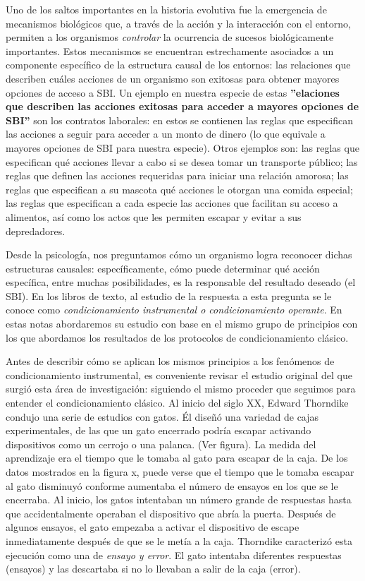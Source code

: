 \documentclass[
  a4paper,
  DIV=11,
  numbers=noendperiod]{scrreprt}
\begin{document}
Uno de los saltos importantes en la historia evolutiva fue la emergencia
de mecanismos biológicos que, a través de la acción y la interacción con
el entorno, permiten a los organismos \emph{controlar} la ocurrencia de
sucesos biológicamente importantes. Estos mecanismos se encuentran
estrechamente asociados a un componente específico de la estructura
causal de los entornos: las relaciones que describen cuáles acciones de
un organismo son exitosas para obtener mayores opciones de acceso a SBI.
Un ejemplo en nuestra especie de estas \textbf{''elaciones que describen
las acciones exitosas para acceder a mayores opciones de SBI''} son los
contratos laborales: en estos se contienen las reglas que especifican
las acciones a seguir para acceder a un monto de dinero (lo que equivale
a mayores opciones de SBI para nuestra especie). Otros ejemplos son: las
reglas que especifican qué acciones llevar a cabo si se desea tomar un
transporte público; las reglas que definen las acciones requeridas para
iniciar una relación amorosa; las reglas que especifican a su mascota
qué acciones le otorgan una comida especial; las reglas que especifican
a cada especie las acciones que facilitan su acceso a alimentos, así
como los actos que les permiten escapar y evitar a sus depredadores.

Desde la psicología, nos preguntamos cómo un organismo logra reconocer
dichas estructuras causales: específicamente, cómo puede determinar qué
acción específica, entre muchas posibilidades, es la responsable del
resultado deseado (el SBI). En los libros de texto, al estudio de la
respuesta a esta pregunta se le conoce como \emph{condicionamiento
instrumental o condicionamiento operante}. En estas notas abordaremos su
estudio con base en el mismo grupo de principios con los que abordamos
los resultados de los protocolos de condicionamiento clásico.

Antes de describir cómo se aplican los mismos principios a los fenómenos
de condicionamiento instrumental, es conveniente revisar el estudio
original del que surgió esta área de investigación: siguiendo el mismo
proceder que seguimos para entender el condicionamiento clásico. Al
inicio del siglo XX, Edward Thorndike condujo una serie de estudios con
gatos. Él diseñó una variedad de cajas experimentales, de las que un
gato encerrado podría escapar activando dispositivos como un cerrojo o
una palanca. (Ver figura). La medida del aprendizaje era el tiempo que
le tomaba al gato para escapar de la caja. De los datos mostrados en la
figura x, puede verse que el tiempo que le tomaba escapar al gato
disminuyó conforme aumentaba el número de ensayos en los que se le
encerraba. Al inicio, los gatos intentaban un número grande de
respuestas hasta que accidentalmente operaban el dispositivo que abría
la puerta. Después de algunos ensayos, el gato empezaba a activar el
dispositivo de escape inmediatamente después de que se le metía a la
caja. Thorndike caracterizó esta ejecución como una de \emph{ensayo y
error}. El gato intentaba diferentes respuestas (ensayos) y las
descartaba si no lo llevaban a salir de la caja (error).
\end{document}
